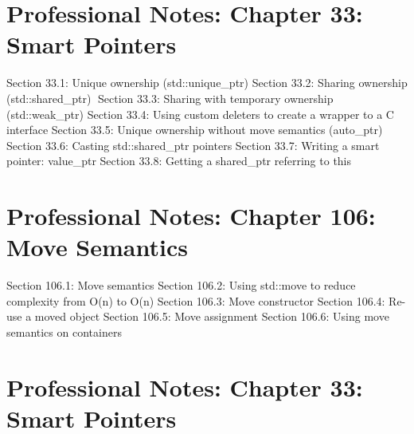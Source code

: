\hypertarget{professional-notes-chapter-33-smart-pointers}{%
\section{Professional Notes: Chapter 33: Smart
Pointers}\label{professional-notes-chapter-33-smart-pointers}}

Section 33.1: Unique ownership (std::unique\_ptr) Section 33.2: Sharing
ownership (std::shared\_ptr) Section 33.3: Sharing with temporary
ownership (std::weak\_ptr) Section 33.4: Using custom deleters to create
a wrapper to a C interface Section 33.5: Unique ownership without move
semantics (auto\_ptr) Section 33.6: Casting std::shared\_ptr pointers
Section 33.7: Writing a smart pointer: value\_ptr Section 33.8: Getting
a shared\_ptr referring to this

\hypertarget{professional-notes-chapter-106-move-semantics}{%
\section{Professional Notes: Chapter 106: Move
Semantics}\label{professional-notes-chapter-106-move-semantics}}

Section 106.1: Move semantics Section 106.2: Using std::move to reduce
complexity from O(n) to O(n) Section 106.3: Move constructor Section
106.4: Re-use a moved object Section 106.5: Move assignment Section
106.6: Using move semantics on containers

\hypertarget{professional-notes-chapter-33-smart-pointers-1}{%
\section{Professional Notes: Chapter 33: Smart
Pointers}\label{professional-notes-chapter-33-smart-pointers-1}}

